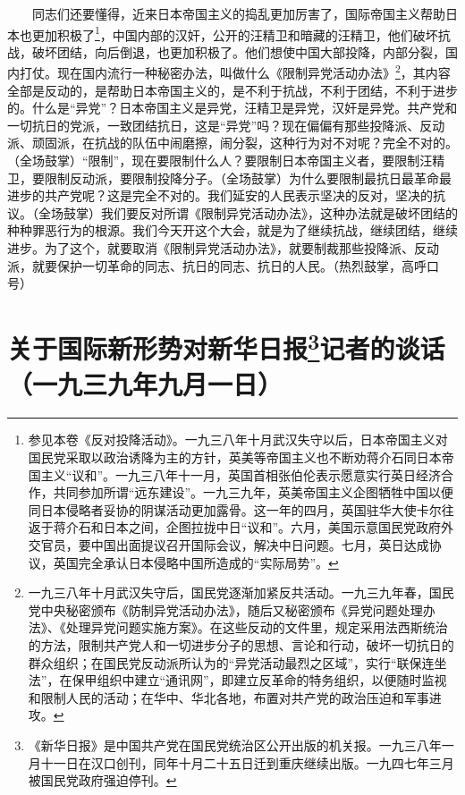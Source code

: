 \documentclass[cn,11pt,chinese]{elegantbook}
\def\myformat#1{\hfil\hfil #1}
\begin{document}
　　同志们还要懂得，近来日本帝国主义的捣乱更加厉害了，国际帝国主义帮助日本也更加积极了\footnote[4]{ 参见本卷《反对投降活动》。一九三八年十月武汉失守以后，日本帝国主义对国民党采取以政治诱降为主的方针，英美等帝国主义也不断劝蒋介石同日本帝国主义“议和”。一九三八年十一月，英国首相张伯伦表示愿意实行英日经济合作，共同参加所谓“远东建设”。一九三九年，英美帝国主义企图牺牲中国以便同日本侵略者妥协的阴谋活动更加露骨。这一年的四月，英国驻华大使卡尔往返于蒋介石和日本之间，企图拉拢中日“议和”。六月，美国示意国民党政府外交官员，要中国出面提议召开国际会议，解决中日问题。七月，英日达成协议，英国完全承认日本侵略中国所造成的“实际局势”。}，中国内部的汉奸，公开的汪精卫和暗藏的汪精卫，他们破坏抗战，破坏团结，向后倒退，也更加积极了。他们想使中国大部投降，内部分裂，国内打仗。现在国内流行一种秘密办法，叫做什么《限制异党活动办法》\footnote[5]{ 一九三八年十月武汉失守后，国民党逐渐加紧反共活动。一九三九年春，国民党中央秘密颁布《防制异党活动办法》，随后又秘密颁布《异党问题处理办法》、《处理异党问题实施方案》。在这些反动的文件里，规定采用法西斯统治的方法，限制共产党人和一切进步分子的思想、言论和行动，破坏一切抗日的群众组织；在国民党反动派所认为的“异党活动最烈之区域”，实行“联保连坐法”，在保甲组织中建立“通讯网”，即建立反革命的特务组织，以便随时监视和限制人民的活动；在华中、华北各地，布置对共产党的政治压迫和军事进攻。}，其内容全部是反动的，是帮助日本帝国主义的，是不利于抗战，不利于团结，不利于进步的。什么是“异党”？日本帝国主义是异党，汪精卫是异党，汉奸是异党。共产党和一切抗日的党派，一致团结抗日，这是“异党”吗？现在偏偏有那些投降派、反动派、顽固派，在抗战的队伍中闹磨擦，闹分裂，这种行为对不对呢？完全不对的。（全场鼓掌）“限制”，现在要限制什么人？要限制日本帝国主义者，要限制汪精卫，要限制反动派，要限制投降分子。（全场鼓掌）为什么要限制最抗日最革命最进步的共产党呢？这是完全不对的。我们延安的人民表示坚决的反对，坚决的抗议。（全场鼓掌）我们要反对所谓《限制异党活动办法》，这种办法就是破坏团结的种种罪恶行为的根源。我们今天开这个大会，就是为了继续抗战，继续团结，继续进步。为了这个，就要取消《限制异党活动办法》，就要制裁那些投降派、反动派，就要保护一切革命的同志、抗日的同志、抗日的人民。（热烈鼓掌，高呼口号）\\
\newpage\section*{\myformat{关于国际新形势对新华日报\footnote[1]{ 《新华日报》是中国共产党在国民党统治区公开出版的机关报。一九三八年一月十一日在汉口创刊，同年十月二十五日迁到重庆继续出版。一九四七年三月被国民党政府强迫停刊。}记者的谈话}\\\myformat{（一九三九年九月一日）}}
\end{document}
